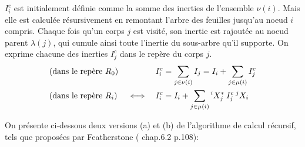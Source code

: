 \documentclass{report}
\begin{document}
$I_i^c$ est initialement définie comme la somme des inerties de l'ensemble $\nu(i)$. Mais elle est calculée résursivement en remontant l'arbre des feuilles jusqu'au noeud $i$ compris. Chaque fois qu'un corps $j$ est visité, son inertie est rajoutée au noeud parent $\lambda(j)$, qui cumule ainsi toute l'inertie du sous-arbre qu'il supporte. On exprime chacune des inerties $I_j^c$ dans le repère du corps $j$. \\

{%
}
{%
  \begin{alignat}{2}
  &\textnormal{(dans le repère $R_0$)} \quad &&{I_i^c} = \sum_{j \in \nu(i)}I_j = I_i + \sum_{j \in \mu(i)}I_j^c \label{equ_inertieCompositeRecurs} \\
  &\textnormal{(dans le repère $R_i$)} \quad \iff &&{I_i^c} = I_i + \sum_{j \in \mu(i)} {^iX_j^*} \: {I_j^c} \: {^jX_i} \label{equ_inertieCompositeLocale}
  \end{alignat}
}{}

On présente ci-dessous deux versions (a) et (b) de l'algorithme de calcul récursif, tels que proposées par Featherstone (\cite{bib_featherstone} chap.6.2 p.108):
\end{document}
